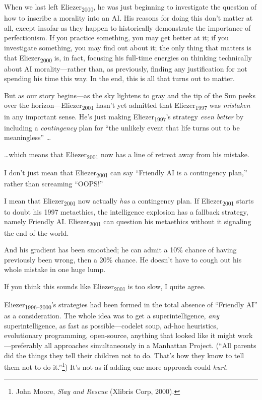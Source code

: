 {
 When we last left Eliezer\textsubscript{2000}, he was just
beginning to investigate the question of how to inscribe a morality
into an AI. His reasons for doing this don't matter at
all, except insofar as they happen to historically demonstrate the
importance of perfectionism. If you practice something, you may get
better at it; if you investigate something, you may find out about it;
the only thing that matters is that Eliezer\textsubscript{2000} is, in
fact, focusing his full-time energies on thinking technically about AI
morality---rather than, as previously, finding any justification for
not spending his time this way. In the end, this is all that turns out
to matter. }

{
 But as our story begins---as the sky lightens to gray and the tip
of the Sun peeks over the horizon---Eliezer\textsubscript{2001}
hasn't yet admitted that Eliezer\textsubscript{1997}
was \textit{mistaken} in any important sense. He's just
making Eliezer\textsubscript{1997}'s strategy
\textit{even better} by including a \textit{contingency} plan for
``the unlikely event that life turns out to be
meaningless'' \ldots}

{
 \ldots which means that Eliezer\textsubscript{2001} now has a line
of retreat away from his mistake.}

{
 I don't just mean that Eliezer\textsubscript{2001}
can say ``Friendly AI is a contingency
plan,'' rather than screaming
``OOPS!''}

{
 I mean that Eliezer\textsubscript{2001} now actually \textit{has}
a contingency plan. If Eliezer\textsubscript{2001} starts to doubt his
1997 metaethics, the intelligence explosion has a fallback strategy,
namely Friendly AI. Eliezer\textsubscript{2001} can question his
metaethics without it signaling the end of the world.}

{
 And his gradient has been smoothed; he can admit a 10\% chance of
having previously been wrong, then a 20\% chance. He
doesn't have to cough out his whole mistake in one huge
lump.}

{
 If you think this sounds like Eliezer\textsubscript{2001} is too
slow, I quite agree.}

{
 Eliezer\textsubscript{1996--2000}'s strategies had
been formed in the total absence of ``Friendly
AI'' as a consideration. The whole idea was to get a
superintelligence, \textit{any} superintelligence, as fast as
possible---codelet soup, ad-hoc heuristics, evolutionary programming,
open-source, anything that looked like it might work---preferably all
approaches simultaneously in a Manhattan Project.
(``All parents did the things they tell their children
not to do. That's how they know to tell them not to do
it.''\footnote{John Moore, \textit{Slay and Rescue} (Xlibris Corp, 2000).}) It's not as
if adding one more approach could \textit{hurt.}}

